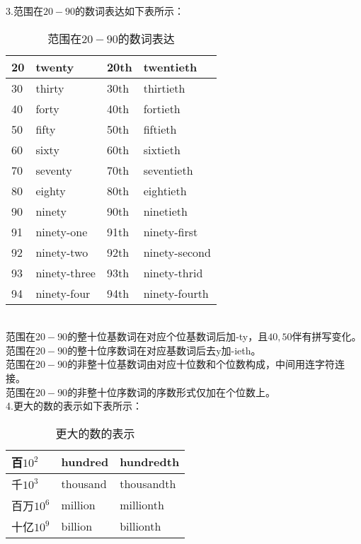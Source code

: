 \documentclass[UTF8]{ctexart}
\newcommand{\littf}[1]{{\hspace{3pt}\ttfamily #1}}
\begin{document}
    3.范围在$20-90$的数词表达如下表所示：\vspace{3pt}
    \begin{table}[h!]
        \begin{center}
            \ttfamily
            \begin{tabular}{p{40pt}|p{100pt}|p{40pt}|p{100pt}}
                \hline
                20&twenty&20th&twentieth\\ \hline
                30&thirty&30th&thirtieth\\ \hline
                40&forty&40th&fortieth\\ \hline
                50&fifty&50th&fiftieth\\ \hline
                60&sixty&60th&sixtieth\\ \hline
                70&seventy&70th&seventieth\\ \hline
                80&eighty&80th&eightieth\\ \hline
                90&ninety&90th&ninetieth\\ \hline
                91&ninety-one&91th&ninety-first\\ \hline
                92&ninety-two&92th&ninety-second\\ \hline
                93&ninety-three&93th&ninety-thrid\\ \hline
                94&ninety-four&94th&ninety-fourth\\ \hline
            \end{tabular}
            \rmfamily
            \caption{范围在$20-90$的数词表达}
        \end{center}
    \end{table}\\
    范围在$20-90$的整十位基数词在对应个位基数词后加\littf{-ty}，且$40,50$伴有拼写变化。\\[3mm]
    范围在$20-90$的整十位序数词在对应基数词后去\littf{y}加\littf{-ieth}。\\[3mm]
    范围在$20-90$的非整十位基数词由对应十位数和个位数构成，中间用连字符连接。\\[3mm]
    范围在$20-90$的非整十位序数词的序数形式仅加在个位数上。\\[10mm]
    4.更大的数的表示如下表所示：\vspace{3pt}
    \begin{table}[h!]
        \begin{center}
            \ttfamily
            \begin{tabular}{p{80pt}|p{100pt}|p{100pt}}
                \hline
                百$10^2$&hundred&hundredth\\ \hline
                千$10^3$&thousand&thousandth\\ \hline
                百万$10^6$&million&millionth\\ \hline
                十亿$10^9$&billion&billionth\\ \hline
            \end{tabular}
            \rmfamily
            \caption{更大的数的表示}
        \end{center}
    \end{table}\\
\end{document}
